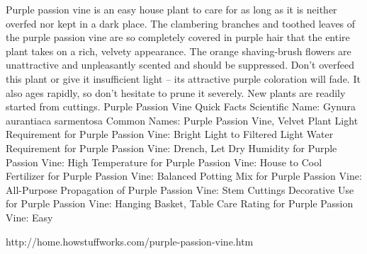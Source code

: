 \documentclass{book}
\begin{document}
Purple passion vine is an easy house plant to care for as long as it is neither overfed nor kept in a dark place.
The clambering branches and toothed leaves of the purple passion vine are so completely covered in purple hair that the entire plant takes on a rich, velvety appearance. The orange shaving-brush flowers are unattractive and unpleasantly scented and should be suppressed.
Don’t overfeed this plant or give it insufficient light -- its attractive purple coloration will fade. It also ages rapidly, so don’t hesitate to prune it severely. New plants are readily started from cuttings.
Purple Passion Vine Quick Facts
Scientific Name: Gynura aurantiaca sarmentosa
Common Names: Purple Passion Vine, Velvet Plant
Light Requirement for Purple Passion Vine: Bright Light to Filtered Light
Water Requirement for Purple Passion Vine: Drench, Let Dry
Humidity for Purple Passion Vine: High
Temperature for Purple Passion Vine: House to Cool
Fertilizer for Purple Passion Vine: Balanced
Potting Mix for Purple Passion Vine: All-Purpose
Propagation of Purple Passion Vine: Stem Cuttings
Decorative Use for Purple Passion Vine: Hanging Basket, Table
Care Rating for Purple Passion Vine: Easy


http://home.howstuffworks.com/purple-passion-vine.htm
\end{document}
